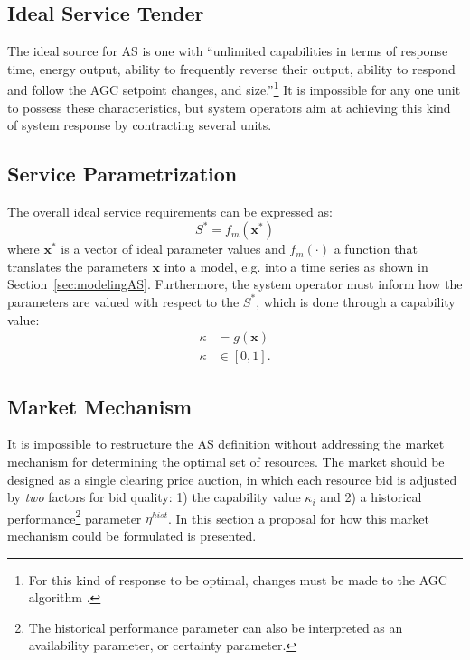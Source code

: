 \subsection*{Ideal Service Tender} %
\label{sub:IdealServiceTender}
The ideal source for AS is one with ``unlimited capabilities in terms of response time, energy output, ability to frequently reverse their output, ability to respond and follow the AGC setpoint changes, and size.''\footnote{For this kind of response to be optimal, changes must be made to the AGC algorithm \cite{peydayesh2012effects}.} It is impossible for any one unit to possess these characteristics, but system operators aim at achieving this kind of system response by contracting several units.

\subsection*{Service Parametrization} %
\label{sub:ServiceParametrization}
The overall ideal service requirements can be expressed as:
\begin{equation}
	S^* = f_m(\textbf{x}^*) \label{eq:optimaltender}
\end{equation}
where $\textbf{x}^*$ is a vector of ideal parameter values and $f_m(\cdot)$ a function that translates the parameters $\textbf{x}$ into a model, e.g. into a time series as shown in Section~\ref{sec:modelingAS}. Furthermore, the system operator must inform how the parameters are valued with respect to the $S^*$, which is done through a capability value:
\begin{align}
    \kappa &= g(\mathbf{x}) \\
    \kappa &\in [0,1].
\end{align}



\subsection*{Market Mechanism} %
\label{sub:MarketMechanism}
It is impossible to restructure the AS definition without addressing the market mechanism for determining the optimal set of resources. The market should be designed as a single clearing price auction, in which each resource bid is adjusted by \emph{two} factors for bid quality: 1) the capability value $\kappa_i$ and 2) a historical performance\footnote{The historical performance parameter can also be interpreted as an availability parameter, or certainty parameter.} parameter $\eta^{hist}$. In this section a proposal for how this market mechanism could be formulated is presented.


